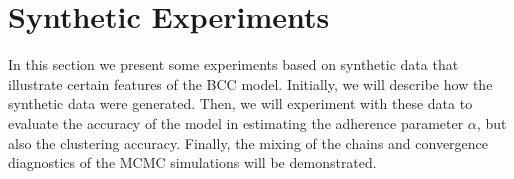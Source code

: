 \section{Synthetic Experiments} \label{integr-synth-exper-sect}
In this section we present some experiments based on synthetic data that illustrate certain features of the BCC model. Initially, we will describe how the synthetic data were generated. Then, we will experiment with these data to evaluate the accuracy of the model in estimating the adherence parameter $\alpha$, but also the clustering accuracy. Finally, the mixing of the chains and convergence diagnostics of the MCMC simulations will be demonstrated.




